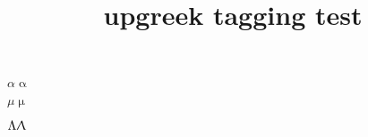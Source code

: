 \documentclass{article}
\title{upgreek tagging test}
\begin{document}
$\alpha\upalpha$

$\mu\upmu$

$\Lambda\Uplambda$
\end{document}
